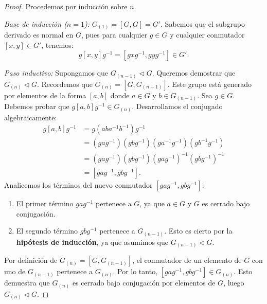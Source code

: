\begin{proof}
    Procedemos por inducción sobre $n$.
    
    \textit{Base de inducción ($n=1$):}
    $G_{(1)} = [G, G] = G'$. Sabemos que el subgrupo derivado es normal en $G$, pues para cualquier $g \in G$ y cualquier conmutador $[x, y] \in G'$, tenemos:
    \begin{equation*}
        g[x, y]g^{-1} = [gxg^{-1}, gyg^{-1}] \in G'.
    \end{equation*}
    
    \textit{Paso inductivo:}
    Supongamos que $G_{(n-1)} \triangleleft G$. Queremos demostrar que $G_{(n)} \triangleleft G$.
    Recordemos que $G_{(n)} = [G, G_{(n-1)}]$. Este grupo está generado por elementos de la forma $[a, b]$ donde $a \in G$ y $b \in G_{(n-1)}$.
    Sea $g \in G$. Debemos probar que $g[a, b]g^{-1} \in G_{(n)}$.
    Desarrollamos el conjugado algebraicamente:
    \begin{align*}
        g[a, b]g^{-1} &= g(aba^{-1}b^{-1})g^{-1} \\
        &= (gag^{-1})(gbg^{-1})(ga^{-1}g^{-1})(gb^{-1}g^{-1}) \\
        &= (gag^{-1})(gbg^{-1})(gag^{-1})^{-1}(gbg^{-1})^{-1} \\
        &= [gag^{-1}, gbg^{-1}].
    \end{align*}
    Analicemos los términos del nuevo conmutador $[gag^{-1}, gbg^{-1}]$:
    \begin{enumerate}
        \item El primer término $gag^{-1}$ pertenece a $G$, ya que $a \in G$ y $G$ es cerrado bajo conjugación.
        \item El segundo término $gbg^{-1}$ pertenece a $G_{(n-1)}$. Esto es cierto por la \textbf{hipótesis de inducción}, ya que asumimos que $G_{(n-1)} \triangleleft G$.
    \end{enumerate}
    Por definición de $G_{(n)} = [G, G_{(n-1)}]$, el conmutador de un elemento de $G$ con uno de $G_{(n-1)}$ pertenece a $G_{(n)}$.
    Por lo tanto, $[gag^{-1}, gbg^{-1}] \in G_{(n)}$.
    Esto demuestra que $G_{(n)}$ es cerrado bajo conjugación por elementos de $G$, luego $G_{(n)} \triangleleft G$.
\end{proof}



